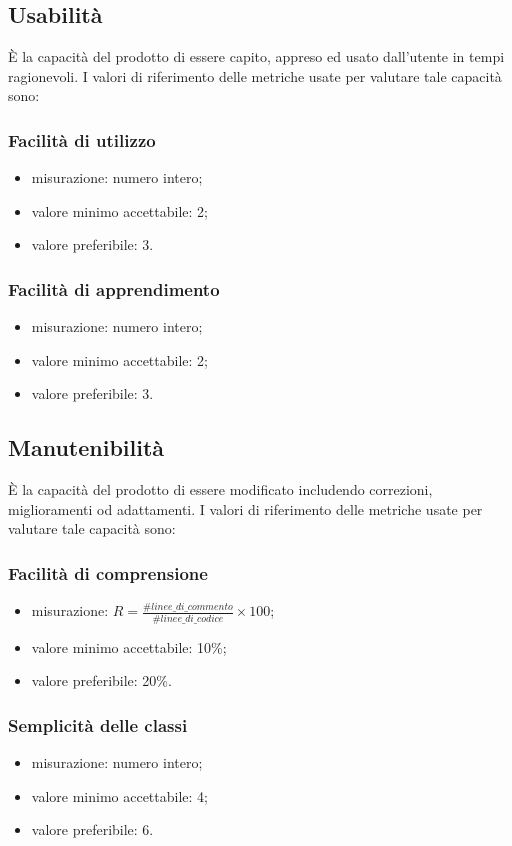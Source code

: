 \subsection{Usabilità}
È la capacità del prodotto di essere capito, appreso ed usato dall'utente in tempi ragionevoli.
I valori di riferimento delle metriche usate per valutare tale capacità sono:

	\subsubsection*{Facilità di utilizzo}
	\begin{itemize}
		\item {misurazione: numero intero;}
		\item {valore minimo accettabile: 2;}
		\item {valore preferibile: 3.}
		\end{itemize}
		
	\subsubsection*{Facilità di apprendimento}
	\begin{itemize}
		\item {misurazione: numero intero;}
		\item {valore minimo accettabile: 2;}
		\item {valore preferibile: 3.}
	\end{itemize}
	
\subsection{Manutenibilità}
È la capacità del prodotto di essere modificato includendo correzioni, miglioramenti od adattamenti. 
I valori di riferimento delle metriche usate per valutare tale capacità sono:

	\subsubsection*{Facilità di comprensione}
	\begin{itemize}
		\item{misurazione: $R = \displaystyle\frac{\#linee\_di\_commento}{\#linee\_di\_codice}\times100$;}
		\item {valore minimo accettabile: 10\%;}
		\item {valore preferibile: 20\%.}
	\end{itemize}
	
	\subsubsection*{Semplicità delle classi}
		\begin{itemize}
			\item {misurazione: numero intero;}
			\item {valore minimo accettabile: 4;}
			\item {valore preferibile: 6.}
	\end{itemize}